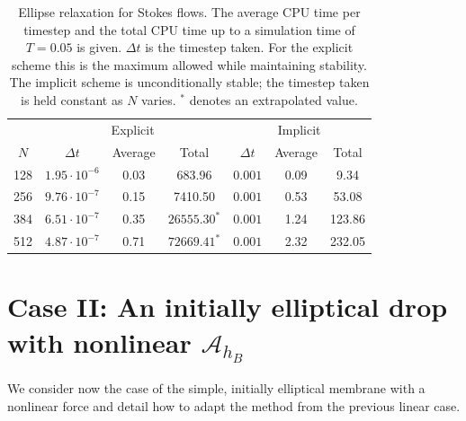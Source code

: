 \documentclass[preprint,12pt]{elsarticle}
\begin{document}
\begin{table}
\caption{Ellipse relaxation for Stokes flows. The average CPU time per timestep and the total CPU time up to a simulation time of 
$T=0.05$ is given. $\Delta t$ is the timestep taken. For the explicit scheme this is the maximum allowed while maintaining stability. The implicit scheme is unconditionally stable; the timestep taken is held constant as $N$ varies.  $^*$ denotes an extrapolated value.}
\label{table:EllipseStokesSims}
\begin{center}
\begin{tabular}{|c |c c c| c c c|}
\hline
& \multicolumn{3}{|c|}{Explicit} & \multicolumn{3}{|c|}{Implicit}\\
$N$ & $\Delta t$ & Average & Total & $\Delta t$ & Average & Total\\
\hline
128 & $1.95\cdot 10^{-6}$ & 0.03 & 683.96 & $0.001$ & 0.09 & 9.34\\
256 & $9.76\cdot 10^{-7}$ & 0.15 & 7410.50 & $0.001$ & 0.53 &  53.08\\
384 & $6.51\cdot 10^{-7}$ & 0.35 & $26555.30^*$ & $0.001$ & 1.24 & 123.86\\
512 & $4.87\cdot 10^{-7}$ & 0.71 & $72669.41^*$ & $0.001$ & 2.32 & 232.05\\
\hline
\end{tabular}
\end{center}
\end{table}



\section{Case II:   An initially elliptical drop with nonlinear $\mathcal{A}_{h_B}$}
\label{Sec:Nonlinear}
We consider now the case of the simple, initially elliptical membrane  with a nonlinear force and detail how to adapt the method from the previous linear case.
\end{document}
